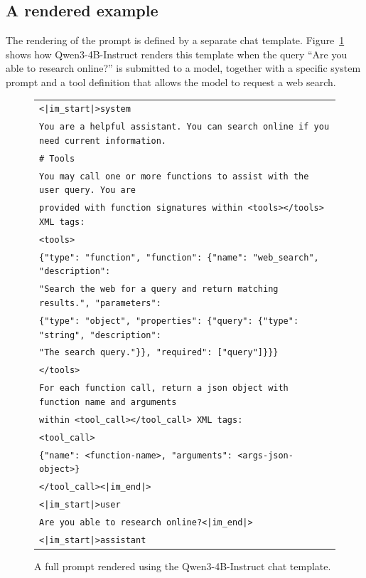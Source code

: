 \subsection{A rendered example}
\label{subsec:rendered-example}

The rendering of the prompt is defined by a separate chat template. Figure~\ref{fig:rendered-example} shows how Qwen3-4B-Instruct \cite{yangQwen3TechnicalReport2025} renders this template when the query ``Are you able to research online?'' is submitted to a model, together with a specific system prompt and a tool definition that allows the model to request a web search.

\begin{figure}[htbp]
\centering
\footnotesize
\begin{tabularx}{\textwidth}{X}
\toprule
\texttt{<|im\_start|>system} \\
\texttt{You are a helpful assistant. You can search online if you need current information.} \\
\texttt{\# Tools} \\
\texttt{You may call one or more functions to assist with the user query. You are} \\
\texttt{provided with function signatures within <tools></tools> XML tags:} \\
\texttt{<tools>} \\
\texttt{\{"type": "function", "function": \{"name": "web\_search", "description":} \\
\texttt{"Search the web for a query and return matching results.", "parameters":} \\
\texttt{\{"type": "object", "properties": \{"query": \{"type": "string", "description":} \\
\texttt{"The search query."\}\}, "required": ["query"]\}\}\}} \\
\texttt{</tools>} \\
\texttt{For each function call, return a json object with function name and arguments} \\
\texttt{within <tool\_call></tool\_call> XML tags:} \\
\texttt{<tool\_call>} \\
\texttt{\{"name": <function-name>, "arguments": <args-json-object>\}} \\
\texttt{</tool\_call><|im\_end|>} \\
\texttt{<|im\_start|>user} \\
\texttt{Are you able to research online?<|im\_end|>} \\
\texttt{<|im\_start|>assistant} \\
\bottomrule
\end{tabularx}
\caption[Full prompt rendered with the Qwen3-4B-Instruct chat template]{A full prompt rendered using the Qwen3-4B-Instruct chat template.}
\label{fig:rendered-example}
\end{figure}

